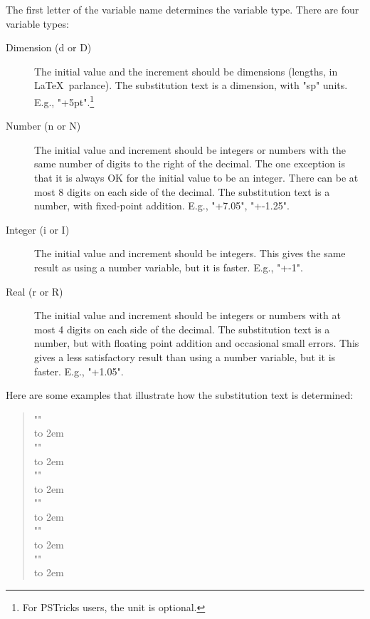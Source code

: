  The first letter of the variable name determines the variable type. There are
four variable types:
\begin{description}
 \item[Dimension (d or D)] The initial value and the increment should be
dimensions (lengths, in \LaTeX\ parlance). The substitution text is a
dimension, with "sp" units. E.g., "\dx=4cm+5pt".\footnote{For PSTricks users,
the unit is optional.}

 \item[Number (n or N)] The initial value and increment should be integers or
numbers with the same number of digits to the right of the decimal. The one
exception is that it is always OK for the initial value to be an integer.
There can be at most 8 digits on each side of the decimal. The substitution
text is a number, with fixed-point addition. E.g., "+7.05",
"+-1.25".

 \item[Integer (i or I)] The initial value and increment should be integers.
This gives the same result as using a number variable, but it is faster. E.g.,
"+-1".

 \item[Real (r or R)] The initial value and increment should be integers or
numbers with at most 4 digits on each side of the decimal. The substitution
text is a number, but with floating point addition and occasional small
errors. This gives a less satisfactory result than using a number variable,
but it is faster. E.g., "+1.05".
\end{description}

 Here are some examples that illustrate how the substitution text is
determined:
\begin{quote}
  ""\\[3pt]
    \hbox to 2em{}\\[8pt]
  ""\\[3pt]
    \hbox to 2em{}\\[8pt]
  ""\\[3pt]
    \hbox to 2em{}\\[8pt]
  ""\\[3pt]
    \hbox to 2em{}\\[8pt]
  ""\\[3pt]
    \hbox to 2em{}\\[8pt]
  ""\\[3pt]
    \hbox to 2em{}
\end{quote}

